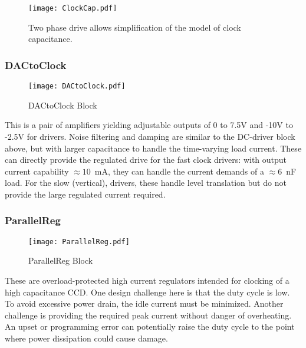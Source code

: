\documentclass[a4paper,12pt]{article}
\begin{document}
   \begin{figure}[h]
   \begin{center}
   \texttt{[image: ClockCap.pdf]}
   \caption{Two phase drive allows simplification of the model of clock capacitance.}
   \label{ClockCap}
   \end{center}
   \end{figure}

\subsubsection{DACtoClock}

   \begin{figure}
   \begin{center}
   \texttt{[image: DACtoClock.pdf]}
   \end{center}
   \caption{DACtoClock Block}
   \end{figure}


This is a pair of amplifiers yielding adjustable outputs of 0 to 7.5V and -10V to -2.5V for drivers. Noise filtering and damping are similar to the DC-driver block above, but with larger capacitance to handle the time-varying load current. These can directly provide the regulated drive for the fast clock drivers: with output current capability $\approx 10$\ mA, they can handle the current demands of a $\approx 6$\ nF load. For the slow (vertical), drivers, these handle level translation but do not provide the large regulated current required.

\subsubsection{ParallelReg}
   \begin{figure}
   \begin{center}
   \texttt{[image: ParallelReg.pdf]}
   \end{center}
   \caption{ParallelReg Block}
   \end{figure}

These are overload-protected high current regulators intended for clocking of a high capacitance CCD. One design challenge here is that the duty cycle is low. To avoid excessive power drain, the idle current must be minimized. Another challenge is providing the required peak current without danger of overheating. An upset or programming error can  potentially raise the duty cycle to the point where power dissipation could cause damage.
\end{document}
